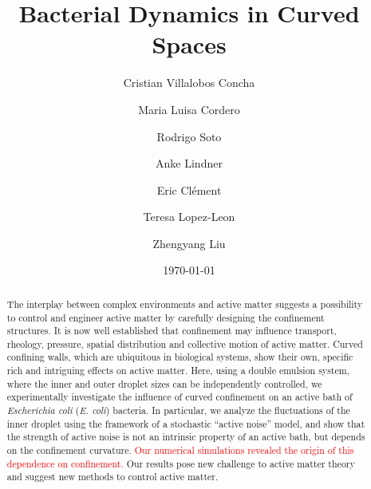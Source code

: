 \documentclass[%
10pt,
superscriptaddress,
twocolumn,
 amsmath,amssymb,
 aps,prx,
]{revtex4-2}
\newcommand{\ecoli}[0]{\textit{E. coli}} %
\begin{document}

\title{Bacterial Dynamics in Curved Spaces}%

\author{Cristian Villalobos Concha}
\author{Maria Luisa Cordero}
\author{Rodrigo Soto}

\author{Anke Lindner}
\author{Eric Clément}
%

\author{Teresa Lopez-Leon}

\date{\today}
\author{Zhengyang Liu}

%

\begin{abstract}
The interplay between complex environments and active matter suggests a possibility to control and engineer active matter by carefully designing the confinement structures.
It is now well established that confinement may influence transport, rheology, pressure, spatial distribution and collective motion of active matter.
Curved confining walls, which are ubiquitous in biological systems, show their own, specific rich and intriguing effects on active matter.
Here, using a double emulsion system, where the inner and outer droplet sizes can be independently controlled, we experimentally investigate the influence of curved confinement on an active bath of \textit{Escherichia coli} (\ecoli) bacteria.
In particular, we analyze the fluctuations of the inner droplet using the framework of a stochastic ``active noise'' model, and show that the strength of active noise is not an intrinsic property of an active bath, but depends on the confinement curvature.
\textcolor{red}{Our numerical simulations revealed the origin of this dependence on confinement.}
Our results pose new challenge to active matter theory and suggest new methods to control active matter.

\end{abstract}
\end{document}
